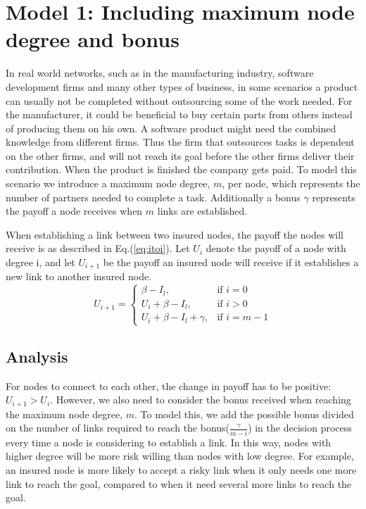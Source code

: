 \section{Model 1: Including maximum node degree and bonus}
In real world networks, such as in the manufacturing industry, software development firms and many other types of business, in some scenarios a product can usually not be completed without outsourcing some of the work needed. For the manufacturer, it could be beneficial to buy certain parts from others instead of producing them on his own. A software product might need the combined knowledge from different firms. Thus the firm that outsources tasks is dependent on the other firms, and will not reach its goal before the other firms deliver their contribution. When the product is finished the company gets paid.
To model this scenario we introduce a maximum node degree, $m$, per node, which represents the number of partners needed to complete a task. Additionally a bonus $\gamma$ represents the payoff a node receives when $m$ links are established. 

When establishing a link between two insured nodes, the payoff the nodes will receive is as described in Eq.(\ref{eq:itoi}).
Let $U_{i}$ denote the payoff of a node with degree i, and let $U_{i+1}$ be the payoff
an insured node will receive if it establishes a new link to another insured node.
\begin{equation}
    U_{i+1}= 
\begin{cases}
    \beta - I_{l},& \text{if } i = 0\\
    U_{i}+\beta -I_{l},& \text{if }  i>0\\
    U_{i}+\beta -I_{l}+\gamma,& \text{if } i=m-1
    
\end{cases}
\label{eq:itoi}
\end{equation}

\subsection{Analysis}

For nodes to connect to each other, the change in payoff has to be positive: $U_{i+1} > U_{i}$. However, we also need to consider the bonus received when reaching the maximum node degree, $m$. 
To model this, we add the possible bonus divided on the number of links required to reach the bonus($\frac{\gamma}{m-i}$) in the decision process every time a node is considering to establish a link. 
In this way, nodes with higher degree will be more risk willing than nodes with low degree. For example, an insured node is more likely to accept a risky link when it only needs one more link to reach the goal, compared to when it need several more links to reach the goal.

